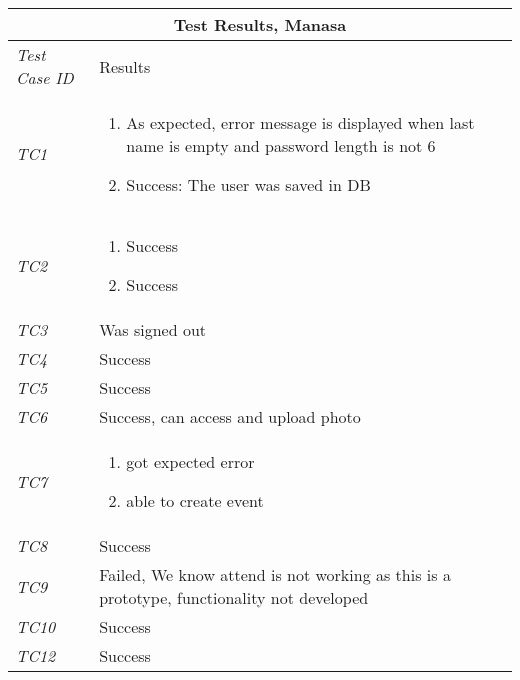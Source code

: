 %
\begin{minipage}{\linewidth}
\setlength{\tabcolsep}{15pt}
\centering
{}
\begin{tabular}{ |l|p{70mm}| }
	\hline
	\multicolumn{2}{|c|}{\cellcolor{gray!25} \textbf{Test Results, Manasa}} \\
	\hline
	\it{\cellcolor{gray!25}Test Case ID} & {\cellcolor{gray!25} Results } \\
	\hline
	\it{\cellcolor{gray!25}TC1} & \begin{enumerate}[label=\alph*)]
	                                \item As expected, error message is displayed when last name is empty and password length is not 6
	                                \item Success: The user was saved in DB
	                              \end{enumerate}\\ \hline
	\it{\cellcolor{gray!25}TC2} & \begin{enumerate}
	                                \item Success
	                                \item Success
	                              \end{enumerate}\\ \hline
	\it{\cellcolor{gray!25}TC3} & Was signed out \\ \hline
	\it{\cellcolor{gray!25}TC4} & Success \\ \hline
	\it{\cellcolor{gray!25}TC5} & Success \\ \hline
	\it{\cellcolor{gray!25}TC6} & Success, can access and upload photo  \\ \hline
	\it{\cellcolor{gray!25}TC7} & \begin{enumerate}[label=\alph*)]
	                                \item got expected error
	                                \item able to  create event
	                              \end{enumerate}\\ \hline
	\it{\cellcolor{gray!25}TC8} & Success \\ \hline
	\it{\cellcolor{gray!25}TC9} & Failed, We know attend is not working as this is a prototype, functionality not developed \\ \hline
	\it{\cellcolor{gray!25}TC10} & Success \\ \hline
	\it{\cellcolor{gray!25}TC12} & Success \\ \hline

\end{tabular}
\end{minipage}
